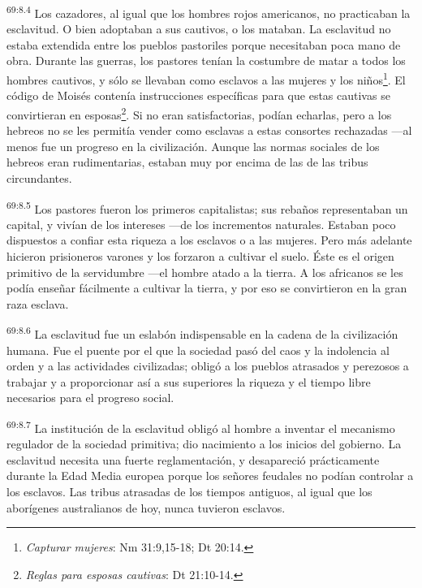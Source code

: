 \documentclass[twoside, 11pt]{book}
\begin{document}
\par
\textsuperscript{69:8.4} Los cazadores, al igual que los hombres rojos americanos, no practicaban la esclavitud. O bien adoptaban a sus cautivos, o los mataban. La esclavitud no estaba extendida entre los pueblos pastoriles porque necesitaban poca mano de obra. Durante las guerras, los pastores tenían la costumbre de matar a todos los hombres cautivos, y sólo se llevaban como esclavos a las mujeres y los niños\footnote{\textit{Capturar mujeres}: Nm 31:9,15-18; Dt 20:14.}. El código de Moisés contenía instrucciones específicas para que estas cautivas se convirtieran en esposas\footnote{\textit{Reglas para esposas cautivas}: Dt 21:10-14.}. Si no eran satisfactorias, podían echarlas, pero a los hebreos no se les permitía vender como esclavas a estas consortes rechazadas ---al menos fue un progreso en la civilización. Aunque las normas sociales de los hebreos eran rudimentarias, estaban muy por encima de las de las tribus circundantes.

\par
\textsuperscript{69:8.5} Los pastores fueron los primeros capitalistas; sus rebaños representaban un capital, y vivían de los intereses ---de los incrementos naturales. Estaban poco dispuestos a confiar esta riqueza a los esclavos o a las mujeres. Pero más adelante hicieron prisioneros varones y los forzaron a cultivar el suelo. Éste es el origen primitivo de la servidumbre ---el hombre atado a la tierra. A los africanos se les podía enseñar fácilmente a cultivar la tierra, y por eso se convirtieron en la gran raza esclava.

\par
\textsuperscript{69:8.6} La esclavitud fue un eslabón indispensable en la cadena de la civilización humana. Fue el puente por el que la sociedad pasó del caos y la indolencia al orden y a las actividades civilizadas; obligó a los pueblos atrasados y perezosos a trabajar y a proporcionar así a sus superiores la riqueza y el tiempo libre necesarios para el progreso social.

\par
\textsuperscript{69:8.7} La institución de la esclavitud obligó al hombre a inventar el mecanismo regulador de la sociedad primitiva; dio nacimiento a los inicios del gobierno. La esclavitud necesita una fuerte reglamentación, y desapareció prácticamente durante la Edad Media europea porque los señores feudales no podían controlar a los esclavos. Las tribus atrasadas de los tiempos antiguos, al igual que los aborígenes australianos de hoy, nunca tuvieron esclavos.
\end{document}
